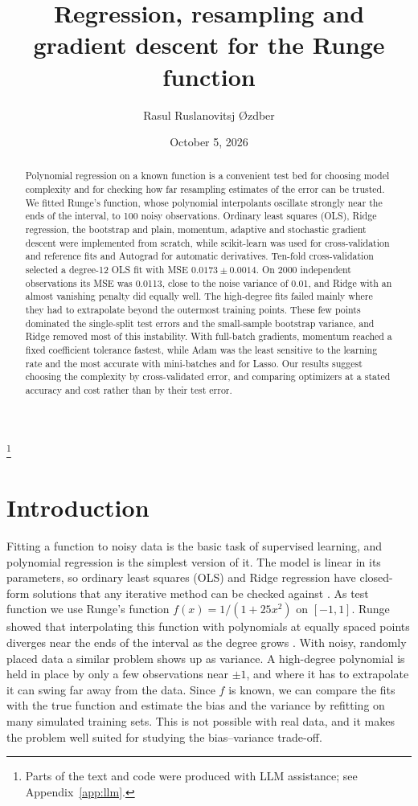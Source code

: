 \documentclass[aps,prb,reprint,superscriptaddress,nofootinbib,longbibliography,floatfix]{revtex4-2}
\begin{document}
\title{Regression, resampling and gradient descent for the Runge function}
\author{Rasul Ruslanovitsj {\O}zdber}
\thanks{Parts of the text and code were produced with LLM assistance; see Appendix~\protect\ref{app:llm}.}
\date{October 5, 2026}

\begin{abstract}
Polynomial regression on a known function is a convenient test bed for choosing model complexity and for checking how far resampling estimates of the error can be trusted. We fitted Runge's function, whose polynomial interpolants oscillate strongly near the ends of the interval, to 100 noisy observations. Ordinary least squares (OLS), Ridge regression, the bootstrap and plain, momentum, adaptive and stochastic gradient descent were implemented from scratch, while scikit-learn was used for cross-validation and reference fits and Autograd for automatic derivatives. Ten-fold cross-validation selected a degree-12 OLS fit with MSE $0.0173\pm0.0014$. On 2000 independent observations its MSE was 0.0113, close to the noise variance of 0.01, and Ridge with an almost vanishing penalty did equally well. The high-degree fits failed mainly where they had to extrapolate beyond the outermost training points. These few points dominated the single-split test errors and the small-sample bootstrap variance, and Ridge removed most of this instability. With full-batch gradients, momentum reached a fixed coefficient tolerance fastest, while Adam was the least sensitive to the learning rate and the most accurate with mini-batches and for Lasso. Our results suggest choosing the complexity by cross-validated error, and comparing optimizers at a stated accuracy and cost rather than by their test error.
\end{abstract}
\maketitle

\section{Introduction}\label{sec:intro}
Fitting a function to noisy data is the basic task of supervised learning, and polynomial regression is the simplest version of it. The model is linear in its parameters, so ordinary least squares (OLS) and Ridge regression have closed-form solutions that any iterative method can be checked against \cite{HjorthJensen2026,Hastie2009}. As test function we use Runge's function $f(x)=1/(1+25x^2)$ on $[-1,1]$. Runge showed that interpolating this function with polynomials at equally spaced points diverges near the ends of the interval as the degree grows \cite{Runge1901}. With noisy, randomly placed data a similar problem shows up as variance. A high-degree polynomial is held in place by only a few observations near $\pm1$, and where it has to extrapolate it can swing far away from the data. Since $f$ is known, we can compare the fits with the true function and estimate the bias and the variance by refitting on many simulated training sets. This is not possible with real data, and it makes the problem well suited for studying the bias--variance trade-off.
\end{document}
